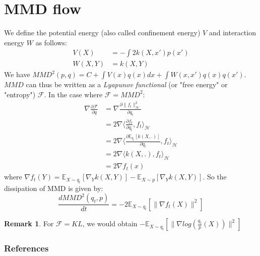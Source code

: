 \documentclass{article}
\newcommand{\1}{\mathbbm 1}
\newcommand{\E}{{{\mathbb E}}}
\newcommand{\kH}{{{\mathcal H}}}
\newcommand{\F}{{{\mathcal F}}}
\theoremstyle{definition}
\newtheorem{remark}{Remark}
\newtheorem{remark}[theorem]{Remark}
\begin{document}
\section{MMD flow}

We define the potential energy (also called confinement energy) $V$ and interaction energy $W$ as follows:
\begin{align}
    V(X)&=-\int 2 k(X,x')p(x')\\
    W(X,Y)&=k(X,Y)
\end{align}
We have $MMD^2(p,q)=C+ \int V(x) q(x)dx + \int W(x,x')q(x)q(x')$. $MMD$ can thus be written as a \textit{Lyapunov functional} (or "free energy" or "entropy") $\F$.
In the case where $\F=MMD^2$:
\begin{align}
        \nabla \frac{\partial \F}{\partial q}&= \nabla \frac{\partial \|f_t\|^2_{\kH}}{\partial q_t}\\
        &=2 \nabla \langle \frac{\partial f_t}{\partial q_t}, f_t \rangle_{\kH}\\
        &=2 \nabla \langle \frac{\partial \E_{q_t}[k(X,.)]}{\partial q_t}, f_t \rangle_{\kH}\\
        &=2 \nabla \langle k(X,.), f_t \rangle_{\kH}\\
        &= 2 \nabla f_t(x)
\end{align}
where $\nabla f_t(Y)= \E_{X \sim q_t}[\nabla_{Y}k(X,Y)] -  \E_{X \sim p}[\nabla_{Y}k(X,Y)]$. So the dissipation of MMD is given by:  
\begin{equation}
    \frac{d MMD^2(q_t, p)}{dt}=-2 \E_{X \sim q_t}[\|\nabla f_t(X)\|^2]
\end{equation}

\begin{remark}
For $\F=KL$, we would obtain $-\E_{X \sim q_t}[\|\nabla log(\frac{q_t}{p}(X))\|^2]$
\end{remark}





\subsubsection*{References}
\renewcommand\refname{\vskip -1cm}


\end{document}
